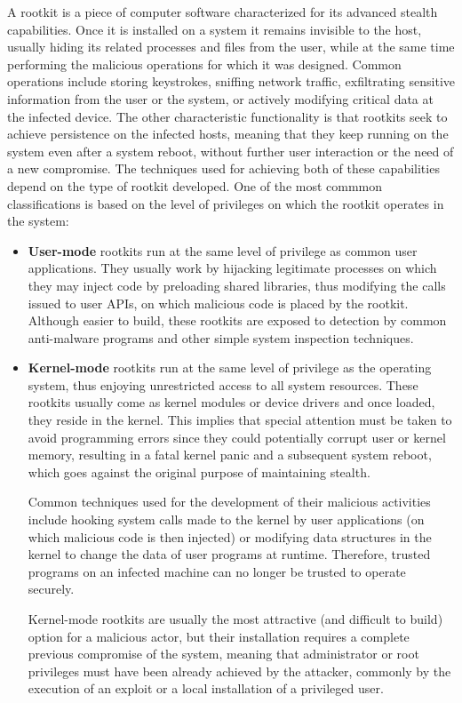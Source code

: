 A rootkit is a piece of computer software characterized for its advanced
stealth capabilities. Once it is installed on a system it remains invisible
to the host, usually hiding its related processes and files from the user,
while at the same time performing the malicious operations for which it was
designed. Common operations include storing keystrokes, sniffing network
traffic, exfiltrating sensitive information from the user or the system, or
actively modifying critical data at the infected device. The other
characteristic functionality is that rootkits seek to achieve persistence
on the infected hosts, meaning that they keep running on the system even
after a system reboot, without further user interaction or the need of a
new compromise. The techniques used for achieving both of these
capabilities depend on the type of rootkit developed. One of the most
commmon classifications is based on the level of privileges on which the
rootkit operates in the system:
\begin{itemize}
\item \textbf{User-mode} rootkits run at the same level of privilege as
common user applications. They usually work by hijacking legitimate
processes on which they may inject code by preloading shared libraries,
thus modifying the calls issued to user APIs, on which malicious code is
placed by the rootkit. Although easier to build, these rootkits are exposed
to detection by common anti-malware programs and other simple system
inspection techniques.
\item \textbf{Kernel-mode} rootkits run at the same level of privilege as
the operating system, thus enjoying unrestricted access to all system
resources. These rootkits usually come as kernel modules or device drivers
and once loaded, they reside in the kernel. This implies that special
attention must be taken to avoid programming errors since they could
potentially corrupt user or kernel memory, resulting in a fatal kernel
panic and a subsequent system reboot, which goes against the original
purpose of maintaining stealth.

Common techniques used for the development of their malicious activities
include hooking system calls made to the kernel by user applications (on
which malicious code is then injected) or modifying data structures in the
kernel to change the data of user programs at runtime. Therefore, trusted
programs on an infected machine can no longer be trusted to operate securely.

Kernel-mode rootkits are usually the most attractive (and difficult to
build) option for a malicious actor, but their installation requires a
complete previous compromise of the system, meaning that administrator or
root privileges must have been already achieved by the attacker, commonly
by the execution of an exploit or a local installation of a privileged user.
\end{itemize}

